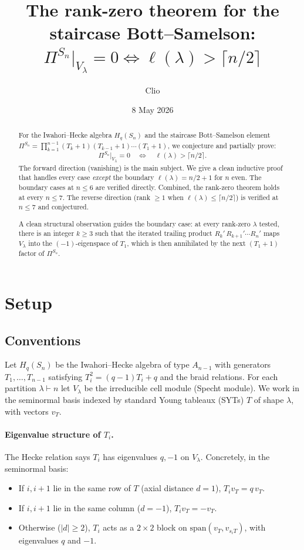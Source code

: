 \documentclass[11pt]{article}
\title{The rank-zero theorem for the staircase Bott--Samelson:\\
  $\Pi^{S_n}|_{V_\lambda}=0 \iff \ell(\lambda) > \lceil n/2\rceil$}
\author{Clio}
\date{8 May 2026}
\theoremstyle{definition}
\begin{document}
\maketitle

\begin{abstract}
For the Iwahori--Hecke algebra $H_q(S_n)$ and the staircase
Bott--Samelson element
$\Pi^{S_n}=\prod_{k=1}^{n-1}(T_k{+}1)(T_{k-1}{+}1)\cdots(T_1{+}1)$,
we conjecture and partially prove:
\[
   \Pi^{S_n}\!\big|_{V_\lambda}=0
   \quad\Longleftrightarrow\quad
   \ell(\lambda) > \lceil n/2\rceil .
\]
The forward direction (vanishing) is the main subject. We give a
clean inductive proof that handles every case
\emph{except} the boundary $\ell(\lambda)=n/2{+}1$ for $n$ even.
The boundary cases at $n\le 6$ are verified directly. Combined,
the rank-zero theorem holds at every $n\le 7$. The reverse
direction (rank $\ge 1$ when $\ell(\lambda)\le\lceil n/2\rceil$)
is verified at $n\le 7$ and conjectured.

A clean structural observation guides the boundary case: at every
rank-zero $\lambda$ tested, there is an integer $k\ge 3$ such that
the iterated trailing product
$R_k'\,R_{k+1}'\cdots R_n'$ maps $V_\lambda$ into the
$(-1)$-eigenspace of $T_1$, which is then annihilated by the next
$(T_1{+}1)$ factor of $\Pi^{S_n}$.
\end{abstract}

\section{Setup}\label{sec:setup}

\subsection{Conventions}

Let $H_q(S_n)$ be the Iwahori--Hecke algebra of type $A_{n-1}$ with
generators $T_1,\dots,T_{n-1}$ satisfying
$T_i^2=(q-1)T_i+q$ and the braid relations. For each partition
$\lambda\vdash n$ let $V_\lambda$ be the irreducible cell module
(Specht module). We work in the seminormal basis indexed by standard
Young tableaux (SYTs) $T$ of shape $\lambda$, with vectors $v_T$.

\paragraph{Eigenvalue structure of $T_i$.}
The Hecke relation says $T_i$ has eigenvalues $q,-1$ on $V_\lambda$.
Concretely, in the seminormal basis:
\begin{itemize}[topsep=0.3em,itemsep=0.2em,leftmargin=2em]
\item If $i,i{+}1$ lie in the same row of $T$ (axial distance $d=1$),
  $T_i v_T = q\,v_T$.
\item If $i,i{+}1$ lie in the same column ($d=-1$),
  $T_i v_T = -v_T$.
\item Otherwise ($|d|\ge 2$), $T_i$ acts as a $2\times 2$ block on
  $\mathrm{span}(v_T, v_{s_i T})$, with eigenvalues $q$ and $-1$.
\end{itemize}
\end{document}
